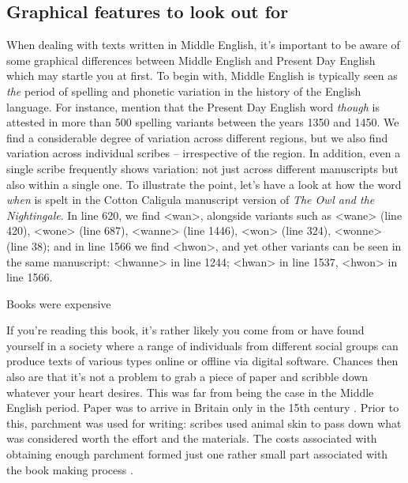 \subsection{Graphical features to look out for}\label{ME-graphical}
When dealing with texts written in Middle English, it's important to be aware of some graphical differences between Middle English and Present Day English which may startle you at first. To begin with, Middle English is typically seen as \textit{the} period of spelling and phonetic variation \citep[224]{Strang1970} in the history of the English language. For instance, \citet[33]{HorobinSmith2002} mention that the Present Day English word \textit{though} is attested in more than 500 spelling variants between the years 1350 and 1450. We find a considerable degree of variation across different regions, but we also find variation across individual scribes -- irrespective of the region. In addition, even a single scribe frequently shows variation: not just across different manuscripts but also within a single one. To illustrate the point, let's have a look at how the word \textit{when} is spelt in the Cotton Caligula manuscript version of \textit{The Owl and the Nightingale}. In line 620, we find <wan>, alongside variants such as <wane> (line 420), <wone> (line 687), <wanne> (line 1446), <won> (line 324), <wonne> (line 38); and in line 1566 we find <hwon>, and yet other variants can be seen in the same manuscript: <hwanne> in line 1244; <hwan> in line 1537, <hwon> in line 1566.


\begin{sourcebox}{Books were expensive}

If you're reading this book, it's rather likely you come from or have found yourself in a society where a range of individuals from different social groups can produce texts of various types online or offline via digital software. Chances then also are that it's not a problem to grab a piece of paper and scribble down whatever your heart desires. This was far from being the case in the Middle English period. Paper was to arrive in Britain only in the 15th century \citep[9]{HorobinSmith2002}. Prior to this, parchment was used for writing: scribes used animal skin to pass down what was considered worth the effort and the materials. The costs associated with obtaining enough parchment formed just one rather small part associated with the book making process \citep{Overty2008}.
\end{sourcebox}


